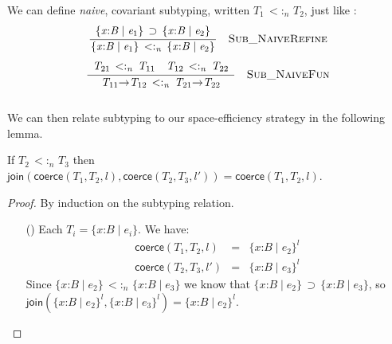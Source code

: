\documentclass[9pt]{extarticle}
\newcommand{\ottdrule}[4][]{{\displaystyle\frac{\begin{array}{l}#2\end{array}}{#3}\quad\ottdrulename{#4}}}
\newcommand{\ottusedrule}[1]{\[#1\]}
\newcommand{\ottpremise}[1]{ #1 \\}
\newcommand{\ottnt}[1]{\mathit{#1}}
\newcommand{\ottmv}[1]{\mathit{#1}}
\newcommand{\ottsym}[1]{#1}
\newcommand{\ottdrulename}[1]{\textsc{#1}}
\newcommand{\ottdruleSubXXNaiveRefine}[1]{\ottdrule[#1]{\ottpremise{ \{ \mathit{x} \mathord{:} \ottnt{B} \mathrel{\mid} \ottnt{e_{{\mathrm{1}}}} \}  \, \supset \,  \{ \mathit{x} \mathord{:} \ottnt{B} \mathrel{\mid} \ottnt{e_{{\mathrm{2}}}} \} }}{
 \{ \mathit{x} \mathord{:} \ottnt{B} \mathrel{\mid} \ottnt{e_{{\mathrm{1}}}} \}  \,  <: _{ \ottmv{n} }  \,  \{ \mathit{x} \mathord{:} \ottnt{B} \mathrel{\mid} \ottnt{e_{{\mathrm{2}}}} \} }{{\ottdrulename{Sub\_NaiveRefine}}{}}}
\newcommand{\ottdruleSubXXNaiveFun}[1]{\ottdrule[#1]{\ottpremise{ \ottnt{T_{{\mathrm{21}}}} \,  <: _{ \ottmv{n} }  \, \ottnt{T_{{\mathrm{11}}}}  \quad  \ottnt{T_{{\mathrm{12}}}} \,  <: _{ \ottmv{n} }  \, \ottnt{T_{{\mathrm{22}}}} }}{
 \ottnt{T_{{\mathrm{11}}}} \mathord{ \rightarrow } \ottnt{T_{{\mathrm{12}}}}  \,  <: _{ \ottmv{n} }  \,  \ottnt{T_{{\mathrm{21}}}} \mathord{ \rightarrow } \ottnt{T_{{\mathrm{22}}}} }{{\ottdrulename{Sub\_NaiveFun}}{}}}
\begin{document}
{\ifveryfull
{}

We can define \textit{naive}, covariant subtyping, written $\ottnt{T_{{\mathrm{1}}}} \,  <: _{ \ottmv{n} }  \, \ottnt{T_{{\mathrm{2}}}}$, just like \citet{Wadler09blame}: \\
\sidebyside
  {\ottusedrule{\ottdruleSubXXNaiveRefine{}}}
  {\ottusedrule{\ottdruleSubXXNaiveFun{}}} \\
We can then relate subtyping to our space-efficiency strategy in the
following lemma.
\begin{lemma}
  If $\ottnt{T_{{\mathrm{2}}}} \,  <: _{ \ottmv{n} }  \, \ottnt{T_{{\mathrm{3}}}}$ then $ \mathsf{join} (  \mathsf{coerce} ( \ottnt{T_{{\mathrm{1}}}} , \ottnt{T_{{\mathrm{2}}}} , \ottnt{l} )  ,  \mathsf{coerce} ( \ottnt{T_{{\mathrm{2}}}} , \ottnt{T_{{\mathrm{3}}}} , \ottnt{l'} )  )   \ottsym{=}   \mathsf{coerce} ( \ottnt{T_{{\mathrm{1}}}} , \ottnt{T_{{\mathrm{2}}}} , \ottnt{l} ) $.
\begin{proof}
    By induction on the subtyping relation.
\begin{itemize}
    \item[(\Sub{Refine})] Each $\ottnt{T_{\ottmv{i}}}  \ottsym{=}   \{ \mathit{x} \mathord{:} \ottnt{B} \mathrel{\mid} \ottnt{e_{\ottmv{i}}} \} $. We have:
\[ \begin{array}{rcl}
         \mathsf{coerce} ( \ottnt{T_{{\mathrm{1}}}} , \ottnt{T_{{\mathrm{2}}}} , \ottnt{l} )  &=&  \{ \mathit{x} \mathord{:} \ottnt{B} \mathrel{\mid} \ottnt{e_{{\mathrm{2}}}} \}^{ \ottnt{l} }  \\
         \mathsf{coerce} ( \ottnt{T_{{\mathrm{2}}}} , \ottnt{T_{{\mathrm{3}}}} , \ottnt{l'} )  &=&  \{ \mathit{x} \mathord{:} \ottnt{B} \mathrel{\mid} \ottnt{e_{{\mathrm{3}}}} \}^{ \ottnt{l} } 
      \end{array} \]
Since $ \{ \mathit{x} \mathord{:} \ottnt{B} \mathrel{\mid} \ottnt{e_{{\mathrm{2}}}} \}  \,  <: _{ \ottmv{n} }  \,  \{ \mathit{x} \mathord{:} \ottnt{B} \mathrel{\mid} \ottnt{e_{{\mathrm{3}}}} \} $ we know that $ \{ \mathit{x} \mathord{:} \ottnt{B} \mathrel{\mid} \ottnt{e_{{\mathrm{2}}}} \}  \, \supset \,  \{ \mathit{x} \mathord{:} \ottnt{B} \mathrel{\mid} \ottnt{e_{{\mathrm{3}}}} \} $, so $ \mathsf{join} (  \{ \mathit{x} \mathord{:} \ottnt{B} \mathrel{\mid} \ottnt{e_{{\mathrm{2}}}} \}^{ \ottnt{l} }  ,  \{ \mathit{x} \mathord{:} \ottnt{B} \mathrel{\mid} \ottnt{e_{{\mathrm{3}}}} \}^{ \ottnt{l} }  )   \ottsym{=}   \{ \mathit{x} \mathord{:} \ottnt{B} \mathrel{\mid} \ottnt{e_{{\mathrm{2}}}} \}^{ \ottnt{l} } $.

\end{itemize}
\end{proof}
\end{lemma}}
\end{document}
